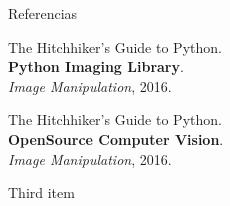 \documentclass{beamer}
\begin{document}
  \begin{frame}{Referencias}
    \begin{enumerate}[{[}1{]}]
      \addtocounter{enumi}{3}

      \item The Hitchhiker's Guide to Python.\\
      \textbf{Python Imaging Library}.\\
      \textit{Image Manipulation}, 2016.

      \item The Hitchhiker's Guide to Python.\\
      \textbf{OpenSource Computer Vision}.\\
      \textit{Image Manipulation}, 2016.

      \item Third item
    \end{enumerate}
  \end{frame}
\end{document}
